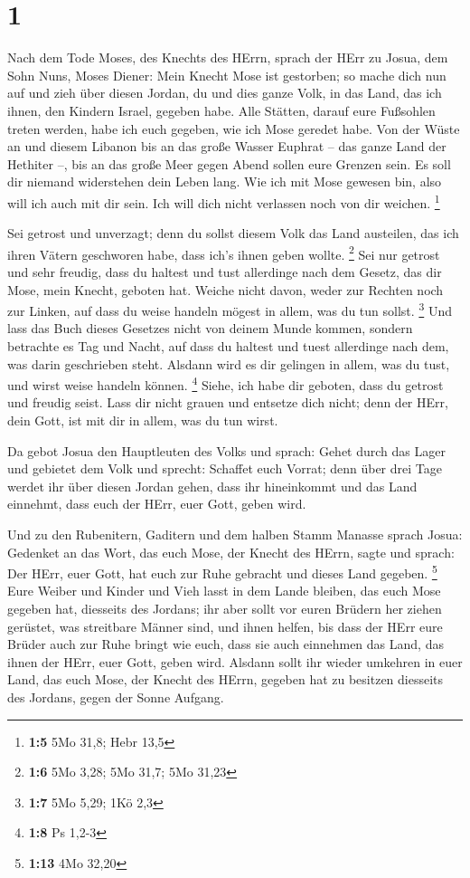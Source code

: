 \hypertarget{section}{%
\section{1}\label{section}}

 Nach dem Tode Moses, des Knechts des HErrn, sprach der HErr
zu Josua, dem Sohn Nuns, Moses Diener:  Mein Knecht Mose ist
gestorben; so mache dich nun auf und zieh über diesen Jordan, du und
dies ganze Volk, in das Land, das ich ihnen, den Kindern Israel, gegeben
habe.  Alle Stätten, darauf eure Fußsohlen treten werden,
habe ich euch gegeben, wie ich Mose geredet habe.  Von der
Wüste an und diesem Libanon bis an das große Wasser Euphrat -- das ganze
Land der Hethiter --, bis an das große Meer gegen Abend sollen eure
Grenzen sein.  Es soll dir niemand widerstehen dein Leben
lang. Wie ich mit Mose gewesen bin, also will ich auch mit dir sein. Ich
will dich nicht verlassen noch von dir weichen. \footnote{\textbf{1:5}
  5Mo 31,8; Hebr 13,5}

 Sei getrost und unverzagt; denn du sollst diesem Volk das
Land austeilen, das ich ihren Vätern geschworen habe, dass ich's ihnen
geben wollte. \footnote{\textbf{1:6} 5Mo 3,28; 5Mo 31,7; 5Mo 31,23}
 Sei nur getrost und sehr freudig, dass du haltest und tust
allerdinge nach dem Gesetz, das dir Mose, mein Knecht, geboten hat.
Weiche nicht davon, weder zur Rechten noch zur Linken, auf dass du weise
handeln mögest in allem, was du tun sollst. \footnote{\textbf{1:7} 5Mo
  5,29; 1Kö 2,3}  Und lass das Buch dieses Gesetzes nicht
von deinem Munde kommen, sondern betrachte es Tag und Nacht, auf dass du
haltest und tuest allerdinge nach dem, was darin geschrieben steht.
Alsdann wird es dir gelingen in allem, was du tust, und wirst weise
handeln können. \footnote{\textbf{1:8} Ps 1,2-3}  Siehe, ich
habe dir geboten, dass du getrost und freudig seist. Lass dir nicht
grauen und entsetze dich nicht; denn der HErr, dein Gott, ist mit dir in
allem, was du tun wirst.

 Da gebot Josua den Hauptleuten des Volks und sprach:
 Gehet durch das Lager und gebietet dem Volk und sprecht:
Schaffet euch Vorrat; denn über drei Tage werdet ihr über diesen Jordan
gehen, dass ihr hineinkommt und das Land einnehmt, dass euch der HErr,
euer Gott, geben wird.

 Und zu den Rubenitern, Gaditern und dem halben Stamm
Manasse sprach Josua:  Gedenket an das Wort, das euch Mose,
der Knecht des HErrn, sagte und sprach: Der HErr, euer Gott, hat euch
zur Ruhe gebracht und dieses Land gegeben. \footnote{\textbf{1:13} 4Mo
  32,20}  Eure Weiber und Kinder und Vieh lasst in dem
Lande bleiben, das euch Mose gegeben hat, diesseits des Jordans; ihr
aber sollt vor euren Brüdern her ziehen gerüstet, was streitbare Männer
sind, und ihnen helfen,  bis dass der HErr eure Brüder auch
zur Ruhe bringt wie euch, dass sie auch einnehmen das Land, das ihnen
der HErr, euer Gott, geben wird. Alsdann sollt ihr wieder umkehren in
euer Land, das euch Mose, der Knecht des HErrn, gegeben hat zu besitzen
diesseits des Jordans, gegen der Sonne Aufgang.

